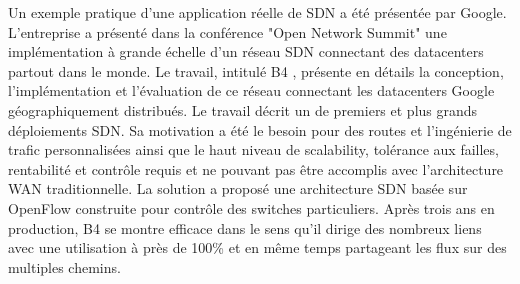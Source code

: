 Un exemple pratique d'une application réelle de SDN a été présentée par Google. L'entreprise a présenté dans la conférence "Open Network Summit" \cite{googleONS} une implémentation à grande échelle d'un réseau SDN connectant des \glspl{datacenter} partout dans le monde. Le travail, intitulé B4 \cite{SDNWANB4}, présente en détails la conception, l'implémentation et l'évaluation de ce réseau connectant les \glspl{datacenter} Google géographiquement distribués. Le travail décrit un de premiers et plus grands déploiements SDN. Sa motivation a été le besoin pour des routes et l'ingénierie de trafic personnalisées ainsi que le haut niveau de \gls{scalability}, tolérance aux failles, rentabilité et contrôle requis et ne pouvant pas être accomplis avec l'architecture WAN traditionnelle. La solution a proposé une architecture SDN basée sur OpenFlow construite pour contrôle des switches particuliers. Après trois ans en production, B4 se montre efficace dans le sens qu'il dirige des nombreux liens avec une utilisation à près de 100\% et en même temps partageant les flux sur des multiples chemins. \cite{SurveySDNApplications}









